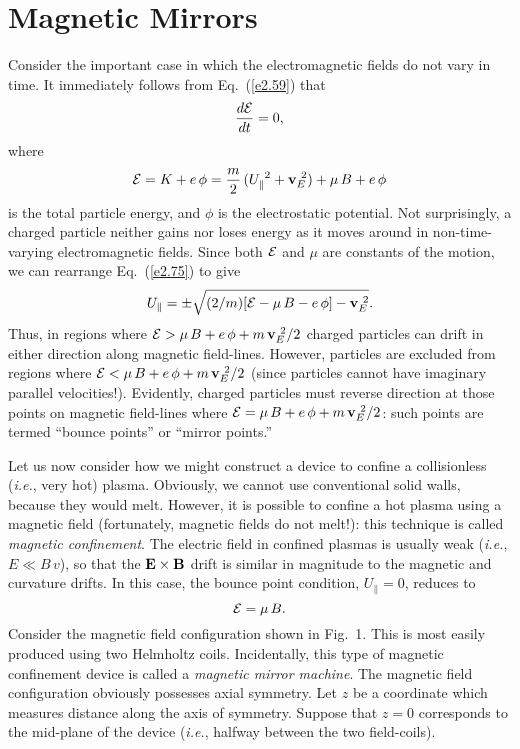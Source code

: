 \section{Magnetic Mirrors}
Consider the important case in which
 the electromagnetic fields do not vary in time. It immediately follows from
Eq.~(\ref{e2.59}) that
\begin{equation}
\frac{d{\cal E}}{dt} =0,
\end{equation}
where
\begin{equation}\label{e2.75}
{\cal E} = K + e\,\phi = \frac{m}{2}\,(U_\parallel^{~2} + {\bf v}_E^{~2}) +\mu\,B
+ e\,\phi
\end{equation}
is the total particle energy, and $\phi$ is the electrostatic potential.
Not surprisingly, a charged particle neither gains nor loses energy as
it moves around in non-time-varying electromagnetic fields. Since
both ${\cal E}$ and $\mu$ are constants of the motion, we can rearrange
Eq.~(\ref{e2.75}) to give
\begin{equation}
U_\parallel = \pm \sqrt{(2/m)[{\cal E} -\mu\,B-e\,\phi]-{\bf v}_E^{~2}}.
\end{equation}
Thus, in regions where ${\cal E} > \mu\,B +e\,\phi + m\,{\bf v}_E^{~2}/2$
charged particles can drift in either direction along magnetic field-lines.
However, particles are excluded from regions where
${\cal E} < \mu\,B +e\,\phi + m\,{\bf v}_E^{~2}/2$ (since particles cannot have
imaginary parallel velocities!). Evidently, charged particles must reverse direction
at those points on magnetic field-lines where ${\cal E} = \mu\,B +e\,\phi + m\,{\bf v}_E^{~2}/2$:
such points are termed ``bounce points'' or ``mirror points.''

Let us now consider how we might construct a device to confine a 
collisionless ({\em i.e.}, very hot) plasma. Obviously, we cannot use conventional
solid walls, because they would melt. However, it is possible to confine a
hot plasma using a magnetic field (fortunately, magnetic fields do not melt!): this 
technique is
called {\em magnetic confinement}.
The electric field in confined plasmas is
usually weak ({\em i.e.}, $E\ll B\,v$), so that the ${\bf E}\times {\bf B}$ drift
is similar in magnitude to the magnetic and curvature drifts. In this
case, the bounce point condition, $U_\parallel = 0$, reduces to
\begin{equation}\label{e2.77}
{\cal E} = \mu\,B.
\end{equation}
Consider the magnetic field configuration shown in Fig.~1. This is most easily
 produced using two Helmholtz coils. Incidentally, this type of magnetic
confinement device is called a {\em magnetic mirror machine}. 
The magnetic field configuration obviously possesses
axial symmetry. Let $z$ be a coordinate which measures distance along the
axis of symmetry. Suppose that $z=0$ corresponds to the mid-plane of the device
({\em i.e.}, halfway between the two field-coils). 

